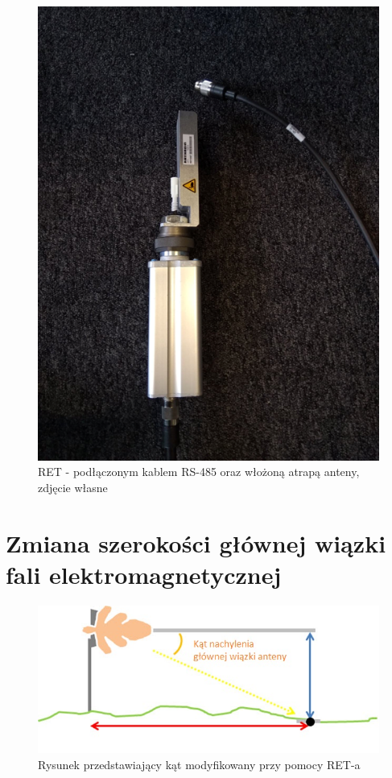 		\begin{figure}[h!]
		\centering
		\includegraphics[scale=0.4]{Obrazki/RET_2.png}
		\caption{RET - podłączonym kablem RS-485 oraz włożoną atrapą anteny, zdjęcie własne}
		\end{figure}

	\section{Zmiana szerokości głównej wiązki fali elektromagnetycznej}
		\begin{figure}[h!]
		\centering
		\includegraphics[scale=1.0]{Obrazki/Angle.jpeg}
		\caption{Rysunek przedstawiający kąt modyfikowany przy pomocy RET-a}
		\end{figure}
		
